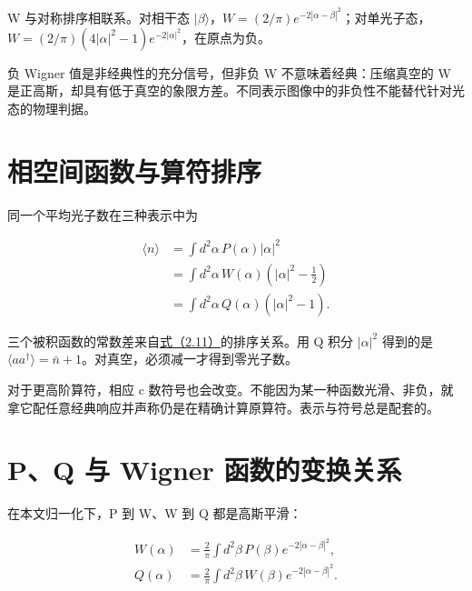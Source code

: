 \documentclass[UTF8,a4paper,zihao=-4,openany,fontset=fandol]{ctexbook}
\begin{document}
W 与对称排序相联系。对相干态 $|\beta\rangle$，$W=(2/\pi)e^{-2|\alpha-\beta|^2}$；对单光子态，$W=(2/\pi)(4|\alpha|^2-1)e^{-2|\alpha|^2}$，在原点为负。



负 Wigner 值是非经典性的充分信号，但非负 W 不意味着经典：压缩真空的 W 是正高斯，却具有低于真空的象限方差。不同表示图像中的非负性不能替代针对光态的物理判据。



\section{相空间函数与算符排序}\label{sec:09:7}


同一个平均光子数在三种表示中为



\begin{equation*}
\begin{aligned}
\langle n\rangle
&=\int d^2\alpha\,P(\alpha)|\alpha|^2\\
&=\int d^2\alpha\,W(\alpha)(|\alpha|^2-\tfrac12)\\
&=\int d^2\alpha\,Q(\alpha)(|\alpha|^2-1).
\end{aligned}
\tag{9.8}\label{eq:9.8}
\end{equation*}


三个被积函数的常数差来自\hyperref[eq:2.11]{式（2.11）}的排序关系。用 Q 积分 $|\alpha|^2$ 得到的是 $\langle aa^\dagger\rangle=\bar n+1$。对真空，必须减一才得到零光子数。



对于更高阶算符，相应 c 数符号也会改变。不能因为某一种函数光滑、非负，就拿它配任意经典响应并声称仍是在精确计算原算符。表示与符号总是配套的。



\section{P、Q 与 Wigner 函数的变换关系}\label{sec:09:8}


在本文归一化下，P 到 W、W 到 Q 都是高斯平滑：



\begin{equation*}
\begin{aligned}
W(\alpha)&=\frac2\pi\int d^2\beta\,
P(\beta)e^{-2|\alpha-\beta|^2},\\
Q(\alpha)&=\frac2\pi\int d^2\beta\,
W(\beta)e^{-2|\alpha-\beta|^2}.
\end{aligned}
\tag{9.9}\label{eq:9.9}
\end{equation*}
\end{document}
